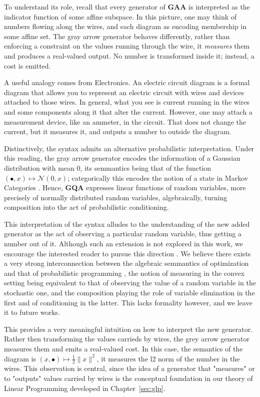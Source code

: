 To understand its role, recall that every generator of $\mathbf{GAA}$ is  interpreted
as the indicator function of some affine subspace. In this  picture, one may think of
numbers flowing along the wires, and each diagram  as encoding membership in some affine set.
The gray arrow  generator behaves differently, rather than enforcing a constraint on the
values running through the wire, it \emph{measures} them and produces a  real-valued output.
No number is transformed inside it; instead, a cost is  emitted.

A useful analogy comes from Electronics.
An electric circuit diagram is a formal diagram that allows you to represent an electric
circuit with wires and devices attached to those wires. In general,
what you see is current running in the wires and some components along it that alter the current. However,
one may attach a measurement device, like an ammeter, in the circuit.
That does not change the current, but it measures it, and outputs a number to outside the diagram.

Distinctively, the syntax admits an alternative probabilistic interpretation.
Under this reading, the gray arrow generator encodes the information of a Gaussian distribution
with mean 0,
its semmantics being that of the function $(\bullet, x)  \mapsto \mathcal{N}(0,x)$; categorically
this encodes the notion of a state in Markov Categories \cite{stein2023gaussian,Cho_2019, fritz2020synthetic}. Hence, \textbf{GQA}
expresses linear functions of random variables, more precisely of normally distributed random variables,
algebraically, turning composition into the act of probabilistic conditioning.

This interpretation of the syntax alludes to the understanding of the new added
generator as the act of observing a particular random variable, thus getting a number out of it.
Although such an extension is not explored in this work, we encourage the interested reader to pursue this
direction \cite{stein2024gqa,stein2025compositional}. We believe there exists a very strong interconnection between
the algebraic semmantics of optimization and that of probabilistic programming \cite{stein2024compositional}, the notion
of measuring in the convex setting being equivalent to that of observing the value of a random variable
in the stochastic one, and the composition playing the role of variable elimination in the first and
of conditioning in the latter. This lacks formality however, and we leave it to future works.

This provides a very meaningful intuition on how to interpret the new generator.
Rather then transforming the values carrieds by wires, the grey arrow generator measures
them and emits a real-valued cost. In this case,
the semantics of the diagram is $(x, \bullet) \mapsto \frac{1}{2}\|x\|^2$,
it measures the l2 norm of the number in the wires. This observation is central, since
the idea of a generator that "measures" or to "outputs" values carried by wires
is the conceptual foundation in our theory of Linear Programming developed in Chapter~\ref{sec:glp}.


